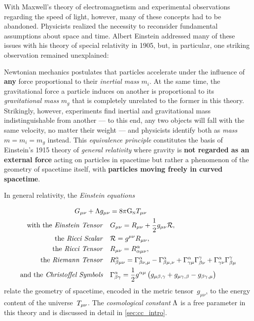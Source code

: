 \documentclass[parskip=half]{scrreprt}
\begin{document}
With Maxwell's theory of electromagnetism and experimental observations regarding the speed of light, however, many of these concepts had to be abandoned. Physicists realized the necessity to reconsider fundamental assumptions about space and time. Albert Einstein addressed many of these issues with his theory of special relativity  in 1905, but, in particular, one striking observation remained unexplained:

Newtonian mechanics postulates that particles accelerate under the influence of \textbf{any} force proportional to their \emph{inertial mass} \(m_i\). At the same time, the gravitational force a particle induces on another is proportional to its \emph{gravitational mass} \(m_g\) that is completely unrelated to the former in this theory. Strikingly, however, experiments find inertial and gravitational mass indistinguishable from another  --- to this end, any two objects will fall with the same velocity, no matter their weight --- and physicists identify both as \emph{mass} \(m=m_i=m_g\) instead. This \emph{equivalence principle} constitutes the basis of Einstein's 1915 theory of \emph{general relativity} where gravity is \textbf{not regarded as an external force} acting on particles in spacetime but rather a phenomenon of the geometry of spacetime itself, with \textbf{particles moving freely in curved spacetime}.

In general relativity, the \emph{Einstein equations}

\begin{align}\label{eq:einstein_eqns}
	\Gtens_{\mu \nu} + \cosmconst g_{\mu\nu} &= 8 \pi \Newtconst \Ttens_{\mu \nu} \\
	\text{with the \emph{Einstein Tensor}} \quad &\Gtens_{\mu \nu} = \Rtens_{\mu \nu} + \frac{1}{2}g_{\mu \nu}\Rscal \eqpunct{,} \label{eq:einstein_tensor} \\
	\text{the \emph{Ricci Scalar}} \quad &\Rscal = g^{\mu \nu}\Rtens_{\mu \nu} \eqpunct{,} \\
	\text{the \emph{Ricci Tensor}} \quad &\Rtens_{\mu \nu} = \Riemtens^\alpha_{\alpha \mu \nu} \eqpunct{,} \\
	\text{the \emph{Riemann Tensor}} \quad &\Riemtens^\alpha_{\beta \mu \nu} = \Gamma^\alpha_{\beta \nu, \mu} - \Gamma^\alpha_{\beta \mu, \nu} + \Gamma^\alpha_{\gamma \mu}\Gamma^\gamma_{\beta \nu} + \Gamma^\alpha_{\gamma \nu}\Gamma^\gamma_{\beta \mu} \\
	\text{and the \emph{Christoffel Symbols}} \quad &\Gamma^\alpha_{\beta \gamma} = \frac{1}{2} g^{\alpha \mu} \del{g_{\mu \beta, \gamma} + g_{\mu \gamma, \beta} - g_{\beta \gamma, \mu}}
\end{align}
relate the geometry of spacetime, encoded in the metric tensor~\(g_{\mu \nu}\), to the energy content of the universe~\(T_{\mu \nu}\). The \emph{cosmological constant} \(\Lambda\) is a free parameter in this theory and is discussed in detail in \autoref{sec:cc_intro}.
\end{document}
